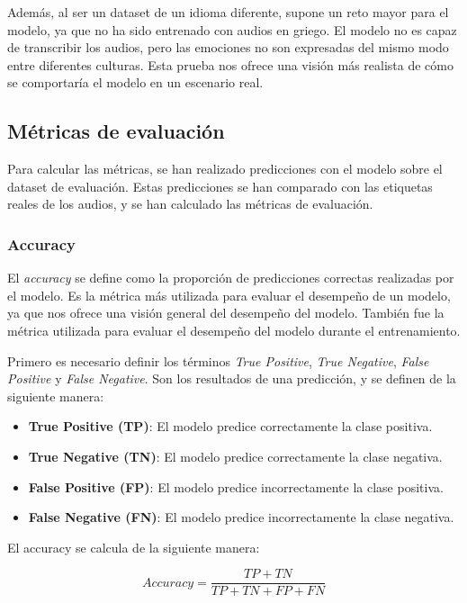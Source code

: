 Además, al ser un dataset de un idioma diferente, supone un reto mayor para el modelo, ya que no ha sido entrenado con audios en griego.
El modelo no es capaz de transcribir los audios, pero las emociones no son expresadas del mismo modo entre diferentes culturas.
Esta prueba nos ofrece una visión más realista de cómo se comportaría el modelo en un escenario real.

\subsection{Métricas de evaluación}\label{seccion:metricas-de-evaluacion}
Para calcular las métricas, se han realizado predicciones con el modelo sobre el dataset de evaluación.
Estas predicciones se han comparado con las etiquetas reales de los audios, y se han calculado las métricas de evaluación.

\subsubsection{Accuracy}\label{seccion:accuracy}
El \textit{accuracy} se define como la proporción de predicciones correctas realizadas por el modelo.
Es la métrica más utilizada para evaluar el desempeño de un modelo, ya que nos ofrece una visión general del desempeño del modelo.
También fue la métrica utilizada para evaluar el desempeño del modelo durante el entrenamiento.

Primero es necesario definir los términos \textit{True Positive}, \textit{True Negative}, \textit{False Positive} y \textit{False Negative}.
Son los resultados de una predicción, y se definen de la siguiente manera:
\begin{itemize}
    \item \textbf{True Positive (TP)}: El modelo predice correctamente la clase positiva.
    \item \textbf{True Negative (TN)}: El modelo predice correctamente la clase negativa.
    \item \textbf{False Positive (FP)}: El modelo predice incorrectamente la clase positiva.
    \item \textbf{False Negative (FN)}: El modelo predice incorrectamente la clase negativa.
\end{itemize}

El accuracy se calcula de la siguiente manera:

\begin{equation}
    Accuracy = \frac{TP + TN}{TP + TN + FP + FN}
\end{equation}

